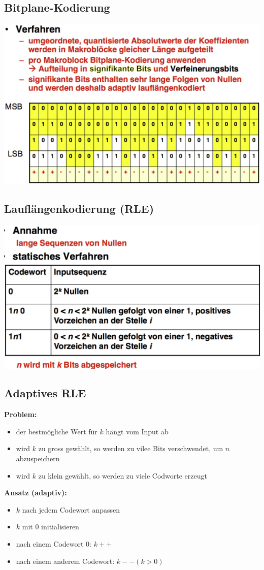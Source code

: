 \documentclass[10pt]{article}
\begin{document}
\subsection{Bitplane-Kodierung}
\begin{center}
	\includegraphics[scale=0.2]{pgf-bitplane-coding.png}
\end{center}
\subsection{Lauflängenkodierung (RLE)}
\begin{center}
	\includegraphics[scale=0.25]{pgf-lauflaengencoding.png}
\end{center}
\subsection{Adaptives RLE}
\textbf{Problem:}
\begin{itemize}
	\item der bestmögliche Wert für $k$ hängt vom Input ab
	\item wird $k$ zu gross gewählt, so werden zu vilee Bits verschwendet, um $n$ abzuspeichern
	\item wird $k$ zu klein gewählt, so werden zu viele Codworte erzeugt
\end{itemize}
\textbf{Ansatz (adaptiv):}
\begin{itemize}
	\item $k$ nach jedem Codewort anpassen
	\item $k$ mit 0 initialisieren
	\item nach einem Codewort 0: $k++$
	\item nach einem anderem Codewort: $k-- (k>0)$
\end{itemize}
\end{document}
